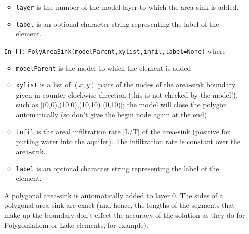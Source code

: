 \documentclass [10pt,letterpaper] {article}
\begin{document}
\begin{itemize}
\begin{itemize}
    \item {\tt layer} is the number of the model layer to which 
    the area-sink is added.
    \item {\tt label} is an optional character string representing the label of the element.
    \end{itemize}
\item[{\tt In []:}] {\tt PolyAreaSink(modelParent,xylist,infil,label=None)} where
    \begin{itemize}
    \item {\tt modelParent} is the model to which the element is
    added
    \item {\tt xylist} is a list of $(x,y)$ pairs of the nodes of
    the area-sink boundary given in counter clockwise
    direction (this is not checked by the model!), such as
    [(0,0),(10,0),(10,10),(0,10)]; the model will close the
    polygon automatically (so don't give the begin node again at
    the end)
    \item {\tt infil} is the areal infiltration rate [L/T] of the
    area-sink (positive for putting water into the aquifer). The infiltration
    rate is constant over the area-sink.
    \item {\tt label} is an optional character string representing the label of the element.
    \end{itemize}
    A polygonal area-sink is automatically added to layer 0. The sides of a polygonal area-sink are exact (and hence, the lengths of the segments that make up the boundary don't effect the accuracy of the solution as they do for PolygonInhom or Lake elements, for example).
\end{itemize}
\end{document}
